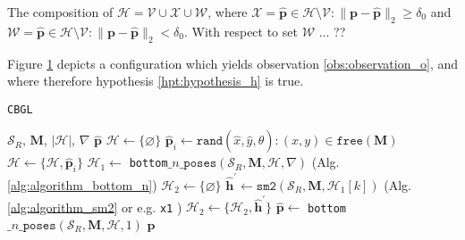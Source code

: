 \begin{remark}
  \label{rem:remark_1}
  The composition of
  $\mathcal{H} = \mathcal{V} \cup \mathcal{X} \cup \mathcal{W}$, where
  $\mathcal{X} = \hat{\bm{p}} \in {\mathcal{H} \setminus \mathcal{V}}: \|\bm{p}-\hat{\bm{p}}\|_2 \geq \delta_0$ and
  $\mathcal{W} = \hat{\bm{p}} \in {\mathcal{H} \setminus \mathcal{V}}: \|\bm{p}-\hat{\bm{p}}\|_2 < \delta_0$.
  With respect to set $\mathcal{W}$ ... ??
\end{remark}


Figure \ref{fig:h_fig1} depicts a configuration which yields observation
\ref{obs:observation_o}, and where therefore hypothesis \ref{hpt:hypothesis_h}
is true.


\begin{figure}
  
  \vspace{1cm}
  \caption{\small }
  \label{fig:h_fig1}
\end{figure}

\begin{figure}[]\centering
  
  \caption{\small }
  \label{fig:cbgl}
\end{figure}


\begin{figure}[]\centering
  
  \caption{\small }
  \label{fig:cbgl}
\end{figure}





\begin{algorithm}
  \caption{\texttt{CBGL}}
  \begin{spacing}{1.2}
  \begin{algorithmic}[1]
    \REQUIRE $\mathcal{S}_R$, $\bm{M}$, $|\mathcal{H}|$, $\nabla$
    \ENSURE $\hat{\bm{p}}$
    \STATE $\mathcal{H} \leftarrow \{\varnothing\}$
      \STATE $\hat{\bm{p}}_i \leftarrow \texttt{rand}(\hat{x},\hat{y},\hat{\theta}): (x,y) \in \texttt{free}(\bm{M})$
      \STATE $\mathcal{H} \leftarrow \{\mathcal{H}, \hat{\bm{p}}_i\}$
    \ENDFOR
    \STATE $\mathcal{H}_1 \leftarrow$ \texttt{bottom}$\_n\_\texttt{poses}(\mathcal{S}_R, \bm{M}, \mathcal{H}, \nabla)$ \hfill (Alg. \ref{alg:algorithm_bottom_n})
    \STATE $\mathcal{H}_2 \leftarrow \{\varnothing \}$
      \STATE $\hat{\bm{h}}^\prime \leftarrow \texttt{sm2}(\mathcal{S}_R, \bm{M}, \mathcal{H}_1[k])$ \hfill \small (Alg. \ref{alg:algorithm_sm2} or e.g. \texttt{x1} \cite{FILOTHEOU2023100288})
      \STATE $\mathcal{H}_2 \leftarrow \{\mathcal{H}_2, \hat{\bm{h}}^\prime\}$
    \ENDFOR
    \STATE $\hat{\bm{p}} \leftarrow$ \texttt{bottom}$\_n\_\texttt{poses}(\mathcal{S}_R, \bm{M}, \mathcal{H}, 1)$
    \RETURN $\hat{\bm{p}}$
  \end{algorithmic}
  \end{spacing}
  \label{alg:algorithm_cbgl}
\end{algorithm}

